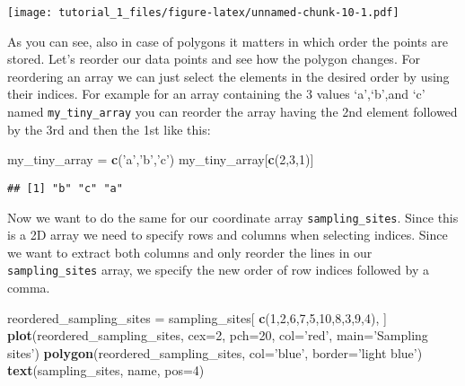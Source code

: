 \documentclass[]{article}
\newenvironment{Shaded}{\begin{snugshade}}{\end{snugshade}}
\newcommand{\DataTypeTok}[1]{\textcolor[rgb]{0.13,0.29,0.53}{#1}}
\newcommand{\DecValTok}[1]{\textcolor[rgb]{0.00,0.00,0.81}{#1}}
\newcommand{\KeywordTok}[1]{\textcolor[rgb]{0.13,0.29,0.53}{\textbf{#1}}}
\newcommand{\NormalTok}[1]{#1}
\newcommand{\StringTok}[1]{\textcolor[rgb]{0.31,0.60,0.02}{#1}}
\begin{document}
\texttt{[image: tutorial\_1\_files/figure-latex/unnamed-chunk-10-1.pdf]}

As you can see, also in case of polygons it matters in which order the
points are stored. Let's reorder our data points and see how the polygon
changes. For reordering an array we can just select the elements in the
desired order by using their indices. For example for an array
containing the 3 values `a',`b',and `c' named \texttt{my\_tiny\_array}
you can reorder the array having the 2nd element followed by the 3rd and
then the 1st like this:

\begin{Shaded}
\begin{Highlighting}[]
\NormalTok{my_tiny_array =}\StringTok{ }\KeywordTok{c}\NormalTok{(}\StringTok{'a'}\NormalTok{,}\StringTok{'b'}\NormalTok{,}\StringTok{'c'}\NormalTok{)}
\NormalTok{my_tiny_array[}\KeywordTok{c}\NormalTok{(}\DecValTok{2}\NormalTok{,}\DecValTok{3}\NormalTok{,}\DecValTok{1}\NormalTok{)]}
\end{Highlighting}
\end{Shaded}

\begin{verbatim}
## [1] "b" "c" "a"
\end{verbatim}

Now we want to do the same for our coordinate array
\texttt{sampling\_sites}. Since this is a 2D array we need to specify
rows and columns when selecting indices. Since we want to extract both
columns and only reorder the lines in our \texttt{sampling\_sites}
array, we specify the new order of row indices followed by a comma.

\begin{Shaded}
\begin{Highlighting}[]
\NormalTok{reordered_sampling_sites =}\StringTok{ }\NormalTok{sampling_sites[ }\KeywordTok{c}\NormalTok{(}\DecValTok{1}\NormalTok{,}\DecValTok{2}\NormalTok{,}\DecValTok{6}\NormalTok{,}\DecValTok{7}\NormalTok{,}\DecValTok{5}\NormalTok{,}\DecValTok{10}\NormalTok{,}\DecValTok{8}\NormalTok{,}\DecValTok{3}\NormalTok{,}\DecValTok{9}\NormalTok{,}\DecValTok{4}\NormalTok{), ]}
\KeywordTok{plot}\NormalTok{(reordered_sampling_sites, }\DataTypeTok{cex=}\DecValTok{2}\NormalTok{, }\DataTypeTok{pch=}\DecValTok{20}\NormalTok{, }\DataTypeTok{col=}\StringTok{'red'}\NormalTok{, }\DataTypeTok{main=}\StringTok{'Sampling sites'}\NormalTok{)}
\KeywordTok{polygon}\NormalTok{(reordered_sampling_sites, }\DataTypeTok{col=}\StringTok{'blue'}\NormalTok{, }\DataTypeTok{border=}\StringTok{'light blue'}\NormalTok{)}
\KeywordTok{text}\NormalTok{(sampling_sites, name, }\DataTypeTok{pos=}\DecValTok{4}\NormalTok{)}
\end{Highlighting}
\end{Shaded}
\end{document}

